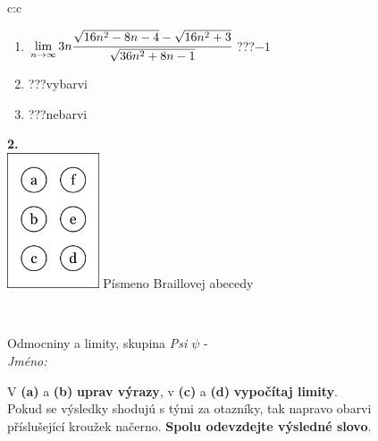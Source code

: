 \documentclass[10pt]{report}
\begin{document}
\begin{tabular}{c:c}
\begin{minipage}[c][104.5mm][t]{0.5\linewidth}
\begin{center}
\begin{minipage}{0.79\linewidth}
\begin{center}
\begin{varwidth}{\linewidth}
\begin{enumerate}
\item $\lim\limits_{n\to\infty}3n\cfrac{\sqrt{16n^2-8n-4}-\sqrt{16n^2+3}}{\sqrt{36n^2+8n-1}}$\quad \dotfill\; ???\;\dotfill \quad $-1$
\item \quad \dotfill\; ???\;\dotfill \quad vybarvi
\item \quad \dotfill\; ???\;\dotfill \quad nebarvi
\end{enumerate}
\end{varwidth}
\end{center}
\end{minipage}
\begin{minipage}{0.20\linewidth}
\begin{center}
{\Huge\bfseries 2.} \\[2mm]
\includegraphics[height=40mm]{../images/braille.png}
{\small Písmeno Braillovej abecedy}
\end{center}
\end{minipage}
\end{center}
\end{minipage}
\\ \hdashline
\begin{minipage}[c][104.5mm][t]{0.5\linewidth}
\begin{center}
\vspace{7mm}
{\huge Odmocniny a limity, skupina \textit{Psi $\psi$} -}\\[5mm]
\textit{Jméno:}\phantom{xxxxxxxxxxxxxxxxxxxxxxxxxxxxxxxxxxxxxxxxxxxxxxxxxxxxxxxxxxxxxxxxx}\\[5mm]
\begin{minipage}{0.95\linewidth}
\begin{center}
V \textbf{(a)} a \textbf{(b)} \textbf{uprav výrazy}, v \textbf{(c)} a \textbf{(d)} \textbf{vypočítaj limity}.\\Pokud se výsledky shodujú s tými za otazníky, tak napravo obarvi\\příslušející kroužek načerno. \textbf{Spolu odevzdejte výsledné slovo}.
\end{center}
\end{minipage}
\\[1mm]

\end{center}
\end{minipage}
\end{tabular}
\end{document}

